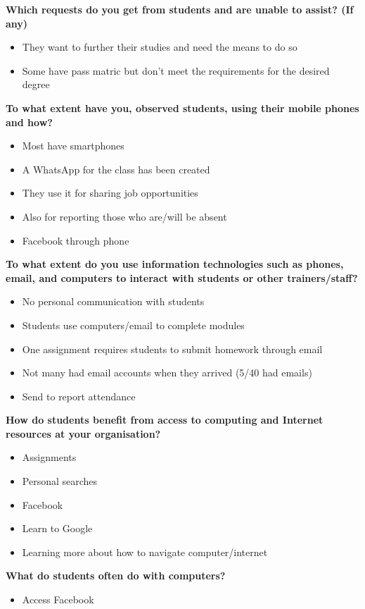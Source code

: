 \noindent\textbf{Which requests do you get from students and are unable to assist? (If any)}
\begin{itemize}
\item They want to further their studies and need the means to do so
\item Some have pass matric but don’t meet the requirements for the desired degree
\end{itemize}

\noindent\textbf{To what extent have you, observed students, using their mobile phones and how?}
\begin{itemize}
\item Most have smartphones
\item A WhatsApp for the class has been created
\item They use it for sharing job opportunities
\item Also for reporting those who are/will be absent
\item Facebook through phone
\end{itemize}

\noindent\textbf{To what extent do you use information technologies such as phones, email, and computers to interact with students or other trainers/staff?}
\begin{itemize}
\item No personal communication with students
\item Students use computers/email to complete modules
\item One assignment requires students to submit homework through email
\item Not many had email accounts when they arrived (5/40 had emails)
\item Send to report attendance
\end{itemize}

\noindent\textbf{How do students benefit from access to computing and Internet resources at your organisation?}
\begin{itemize}
\item Assignments
\item Personal searches
\item Facebook
\item Learn to Google
\item Learning more about how to navigate computer/internet
\end{itemize}

\noindent\textbf{What do students often do with computers?}
\begin{itemize}
\item Access Facebook
\end{itemize}

